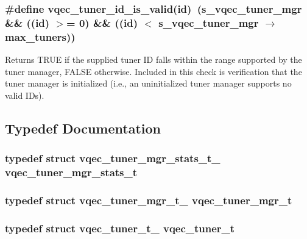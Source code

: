 \subsubsection{\setlength{\rightskip}{0pt plus 5cm}\#define vqec\_\-tuner\_\-id\_\-is\_\-valid(id)~(\bf{s\_\-vqec\_\-tuner\_\-mgr} \&\& ((id) $>$= 0) \&\& ((id) $<$ \bf{s\_\-vqec\_\-tuner\_\-mgr} $\rightarrow$ max\_\-tuners))}\label{vqec__tuner_8c_beb9fe653955e585f43eaeb972d1e666}


Returns TRUE if the supplied tuner ID falls within the range supported by the tuner manager, FALSE otherwise. Included in this check is verification that the tuner manager is initialized (i.e., an uninitialized tuner manager supports no valid IDs). 

\subsection{Typedef Documentation}
\subsubsection{\setlength{\rightskip}{0pt plus 5cm}typedef struct \bf{vqec\_\-tuner\_\-mgr\_\-stats\_\-t\_\-}  \bf{vqec\_\-tuner\_\-mgr\_\-stats\_\-t}}\label{vqec__tuner_8c_4d38ed8d9fdadf6abb8c3eb4769e41b6}


\subsubsection{\setlength{\rightskip}{0pt plus 5cm}typedef struct \bf{vqec\_\-tuner\_\-mgr\_\-t\_\-}  \bf{vqec\_\-tuner\_\-mgr\_\-t}}\label{vqec__tuner_8c_fb53fec9d800e5501bab79feef72196e}


\subsubsection{\setlength{\rightskip}{0pt plus 5cm}typedef struct \bf{vqec\_\-tuner\_\-t\_\-}  \bf{vqec\_\-tuner\_\-t}}\label{vqec__tuner_8c_8fe7456e8d0354131b2426bd54ad22b7}




